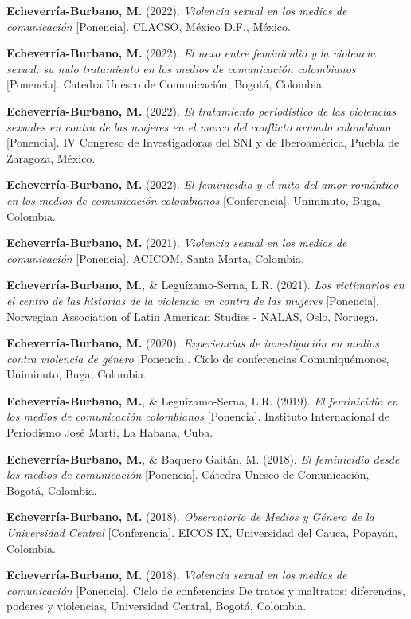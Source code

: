 \documentclass[11pt,a4paper,]{awesome-cv}
\begin{document}
\textbf{Echeverría-Burbano, M.} (2022). \emph{Violencia sexual en los
medios de comunicación} {[}Ponencia{]}. CLACSO, México D.F., México.

\textbf{Echeverría-Burbano, M.} (2022). \emph{El nexo entre feminicidio
y la violencia sexual: su nulo tratamiento en los medios de comunicación
colombianos} {[}Ponencia{]}. Catedra Unesco de Comunicación, Bogotá,
Colombia.

\textbf{Echeverría-Burbano, M.} (2022). \emph{El tratamiento
periodístico de las violencias sexuales en contra de las mujeres en el
marco del conflicto armado colombiano} {[}Ponencia{]}. IV Congreso de
Investigadoras del SNI y de Iberoamérica, Puebla de Zaragoza, México.

\textbf{Echeverría-Burbano, M.} (2022). \emph{El feminicidio y el mito
del amor romántico en los medios de comunicación colombianos}
{[}Conferencia{]}. Uniminuto, Buga, Colombia.

\textbf{Echeverría-Burbano, M.} (2021). \emph{Violencia sexual en los
medios de comunicación} {[}Ponencia{]}. ACICOM, Santa Marta, Colombia.

\textbf{Echeverría-Burbano, M.}, \& Leguízamo-Serna, L.R. (2021).
\emph{Los victimarios en el centro de las historias de la violencia en
contra de las mujeres} {[}Ponencia{]}. Norwegian Association of Latin
American Studies - NALAS, Oslo, Noruega.

\textbf{Echeverría-Burbano, M.} (2020). \emph{Experiencias de
investigación en medios contra violencia de género} {[}Ponencia{]}.
Ciclo de conferencias Comuniquémonos, Uniminuto, Buga, Colombia.

\textbf{Echeverría-Burbano, M.}, \& Leguízamo-Serna, L.R. (2019).
\emph{El feminicidio en los medios de comunicación colombianos}
{[}Ponencia{]}. Instituto Internacional de Periodismo José Martí, La
Habana, Cuba.

\textbf{Echeverría-Burbano, M.}, \& Baquero Gaitán, M. (2018). \emph{El
feminicidio desde los medios de comunicación} {[}Ponencia{]}. Cátedra
Unesco de Comunicación, Bogotá, Colombia.

\textbf{Echeverría-Burbano, M.} (2018). \emph{Observatorio de Medios y
Género de la Universidad Central} {[}Conferencia{]}. EICOS IX,
Universidad del Cauca, Popayán, Colombia.

\textbf{Echeverría-Burbano, M.} (2018). \emph{Violencia sexual en los
medios de comunicación} {[}Ponencia{]}. Ciclo de conferencias De tratos
y maltratos: diferencias, poderes y violencias, Universidad Central,
Bogotá, Colombia.
\end{document}
